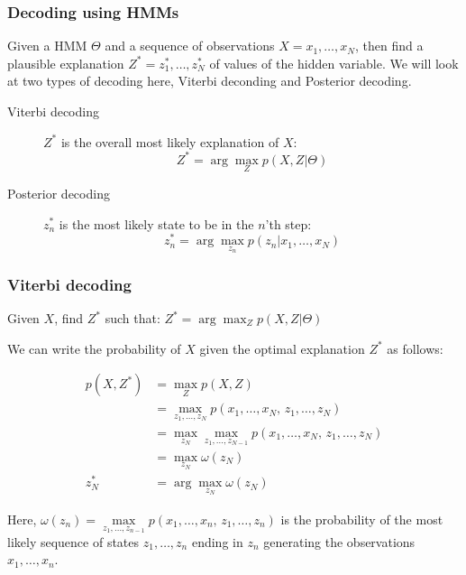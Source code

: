     \subsubsection{Decoding using HMMs}
    Given a HMM $\Theta$ and a sequence of observations $X=x_1,\dots,x_N$, then 
    find a plausible explanation $Z^*=z^*_1,\dots,z^*_N$ of values of the 
    hidden variable.
    We will look at two types of decoding here, Viterbi deconding and Posterior 
    decoding.
    
    \begin{description}
        \item[Viterbi decoding] $Z^*$ is the overall most likely explanation of 
        $X$:
        \begin{equation*}
            Z^* = \arg\max_Z p(X,Z|\Theta)
        \end{equation*}
        \item[Posterior decoding] $z^*_n$ is the most likely state to be in the 
        $n$'th step:
        \begin{equation*}
            z^*_n=\arg\max_{z_n} p(z_n|x_1,\dots,x_N)
        \end{equation*}
    \end{description}
    
    \subsubsection{Viterbi decoding}
    Given $X$, find $Z^*$ such that: $Z^*=\arg\max_Z p(X,Z|\Theta)$
    
    We can write the probability of $X$ given the optimal explanation $Z^*$ as 
    follows:
    
    \begin{align*}
        p(X,Z^*) &= \max_Z p(X,Z)\\
            &= \max_{z_1,\dots,z_N} p(x_1,\dots,x_N,\, z_1,\dots,z_N)\\
            &= \max_{z_N}\max_{z_1,\dots,z_{N-1}} p(x_1,\dots,x_N, \, z_1, 
            \dots, z_N)\\
            &= \max_{z_N}\omega(z_N)\\
            z^*_N &= \arg\max_{z_N} \omega(z_N)
    \end{align*}
    
    Here, $\omega(z_n)=\max\limits_{z_1,\dots,z_{n-1}} 
    p(x_1,\dots,x_n,\,z_1,\dots,z_n)$ is the probability of the most likely 
    sequence of states $z_1,\dots,z_n$ ending in $z_n$ generating the 
    observations $x_1,\dots,x_n$.
    
